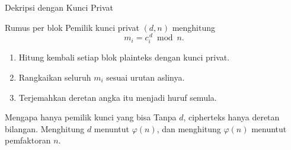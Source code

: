 \documentclass[aspectratio=169,11pt]{beamer}
\begin{document}
\begin{frame}{Dekripsi dengan Kunci Privat}
    \footnotesize
    \begin{block}{Rumus per blok}
        Pemilik kunci privat $(d,n)$ menghitung
        \[
            m_i = c_i^{\,d} \bmod n .
        \]
    \end{block}
    \begin{enumerate}
        \item Hitung kembali setiap blok plainteks dengan kunci privat.
        \item Rangkaikan seluruh $m_i$ sesuai urutan aslinya.
        \item Terjemahkan deretan angka itu menjadi huruf semula.
    \end{enumerate}
    \begin{alertblock}{Mengapa hanya pemilik kunci yang bisa}
        \footnotesize
        Tanpa $d$, cipherteks hanya deretan bilangan. Menghitung $d$
        menuntut $\varphi(n)$, dan menghitung $\varphi(n)$ menuntut
        pemfaktoran $n$.
    \end{alertblock}
\end{frame}
\end{document}
